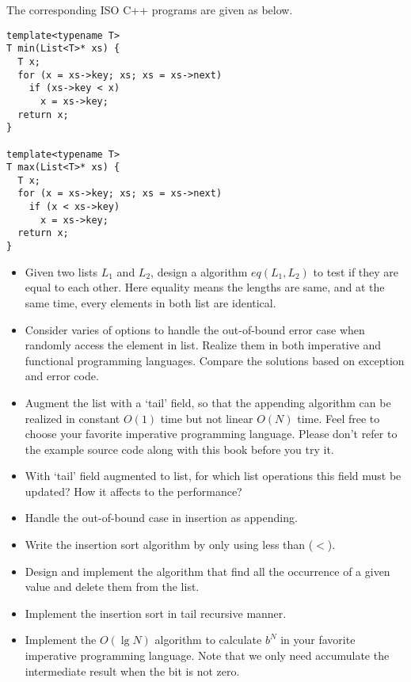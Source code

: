 \documentclass{article}
\begin{document}
The corresponding ISO C++ programs are given as below.

\lstset{language=C++}
\begin{lstlisting}
template<typename T>
T min(List<T>* xs) {
  T x;
  for (x = xs->key; xs; xs = xs->next)
    if (xs->key < x)
      x = xs->key;
  return x;
}

template<typename T>
T max(List<T>* xs) {
  T x;
  for (x = xs->key; xs; xs = xs->next)
    if (x < xs->key)
      x = xs->key;
  return x;
}
\end{lstlisting}

\begin{Exercise}
\begin{itemize}
\item Given two lists $L_1$ and $L_2$, design a algorithm $eq(L_1, L_2)$ to test if they are equal to each other.
Here equality means the lengths are same, and at the same time, every elements in both list are identical.
\item Consider varies of options to handle the out-of-bound error case when randomly access the element in list. Realize
them in both imperative and functional programming languages. Compare the solutions based on exception and error code.
\item Augment the list with a `tail' field, so that the appending algorithm can be realized in constant $O(1)$ time but
not linear $O(N)$ time. Feel free to choose your favorite imperative programming language. Please don't refer to the
example source code along with this book before you try it.
\item With `tail' field augmented to list, for which list operations this field must be updated? How it affects to the
performance?
\item Handle the out-of-bound case in insertion as appending.
\item Write the insertion sort algorithm by only using less than ($<$).
\item Design and implement the algorithm that find all the occurrence of a given value and delete them from the list.
\item Implement the insertion sort in tail recursive manner.
\item Implement the $O(\lg N)$ algorithm to calculate $b^N$ in your favorite imperative programming language. Note that
we only need accumulate the intermediate result when the bit is not zero.
\end{itemize}
\end{Exercise}
\end{document}
